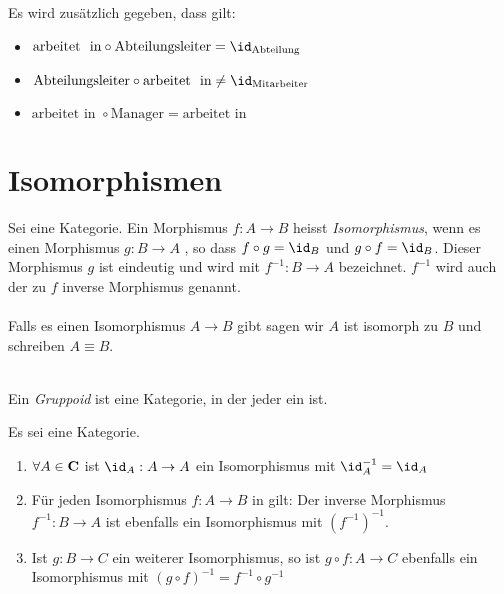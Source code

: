 \documentclass{article}
\begin{document}
	 \begin{bsp}[Datenbanken]
		  \cite[Beispiel 2.2.33]{Bra} \\
		  \\
		 
		 Es wird zus\"atzlich gegeben, dass gilt:
		 \begin{itemize}
			 \item \( \text{arbeitet \ in} \circ \text{Abteilungsleiter}= \id_\text{Abteilung}  \)
			 \item \( \text{Abteilungsleiter} \circ \text{arbeitet \ in} \neq \id_\text{Mitarbeiter}  \)
			 \item \( \text{arbeitet \ in }  \circ \text{Manager} = \text{arbeitet \ in } \)
		 \end{itemize}
	 \end{bsp}
	\newpage
	\section{Isomorphismen}
		
		\begin{defi}[Isomorphismus ]
		 \cite[Definition 2.3.1]{Bra}
		Sei \CatC eine Kategorie. Ein Morphismus \( f: A \to B  \) heisst  \emph{Isomorphismus}, wenn es einen Morphismus \( g: B \to A \) , so dass \( f \circ g  = \id_B \) und \( g \circ f = \id_B \). 
		Dieser Morphismus \( g \) ist eindeutig und wird mit \( f^{-1} :B \to A \) bezeichnet.
		\(f^{-1} \) wird auch der zu \( f \)  inverse Morphismus genannt.\\
		 \\
		Falls es einen Isomorphismus \( A \to B \) gibt sagen wir \( A \) ist isomorph zu \( B \) und schreiben \( A \equiv B \).
		\end{defi}
		
		
		 \begin{defi}[Gruppoid]
		  \cite[Beispiel 2.2.34]{Bra} \\
		 Ein \emph{Gruppoid} ist eine Kategorie, in der jeder \Mor ein \Iso ist.
		  \end{defi}
		  
		  \begin{lem}
		   \cite[Lemma 2.3.9]{Bra}
		  Es sei \CatC eine Kategorie.
		  \begin{enumerate}
			  \item \( \forall A \in \mathbf{C} \) ist \( \id_A :A \to A  \) ein Isomorphismus mit \( \id_A^{-1}=\id_A \)
			  \item F\"ur jeden Isomorphismus \( f: A \to B \) in \CatC gilt: Der inverse Morphismus \(f^{-1}: B \to A \) ist ebenfalls ein Isomorphismus mit \( \left( f^{-1} \right)^{-1} \).
			  \item Ist \(g: B \to C \) ein weiterer Isomorphismus, so ist \( g \circ f :A \to C \) ebenfalls ein Isomorphismus mit \( \left( g \circ f \right)^{-1} =f^{-1} \circ g^{-1} \)  
		  \end{enumerate}
		  	\end{lem}
		  	
\end{document}
